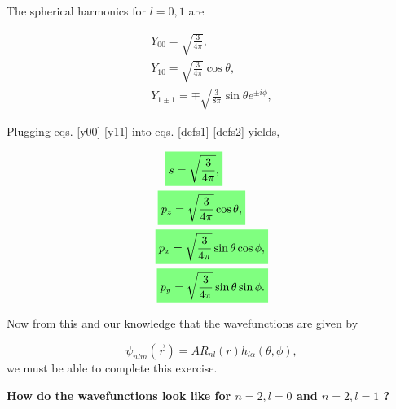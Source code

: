 \begin{questions}
\begin{solution}
  The spherical harmonics for $l=0,1$ are

  \begin{eqnarray}
      Y_{00} = \sqrt{\frac{3}{4\pi}}, \qquad \qquad \quad \label{y00}\\
      Y_{10} = \sqrt{\frac{3}{4\pi}}\cos{\theta}, \qquad \quad \label{y10}\\
      Y_{1\pm1}= \mp \sqrt{\frac{3}{8\pi}}\sin{\theta}e^{\pm i\phi}, \label{y11}
  \end{eqnarray}

  Plugging eqs. \ref{y00}-\ref{y11} into eqs. \ref{defs1}-\ref{defs2} yields,

  \begin{eqnarray}
      \hlgreen{s = \sqrt{\frac{3}{4\pi}},} \qquad \quad \quad\\
      \hlgreen{p_z = \sqrt{\frac{3}{4\pi}}\cos{\theta},} \qquad\\
      \hlgreen{p_x= \sqrt{\frac{3}{4\pi}}\sin{\theta}\cos{\phi},}\\
      \hlgreen{p_y = \sqrt{\frac{3}{4\pi}}\sin{\theta}\sin{\phi}.}
  \end{eqnarray}

  Now from this and our knowledge that the wavefunctions are given by

  \begin{equation}
    \psi_{nlm}(\vec{r}) =A R_{nl}(r)h_{l\alpha}(\theta,\phi),
  \end{equation}
  we must be able to complete this exercise.

  \textbf{How do the wavefunctions look like for $n=2,l=0$ and $n=2,l=1$ ?}


\end{solution}
\end{questions}
